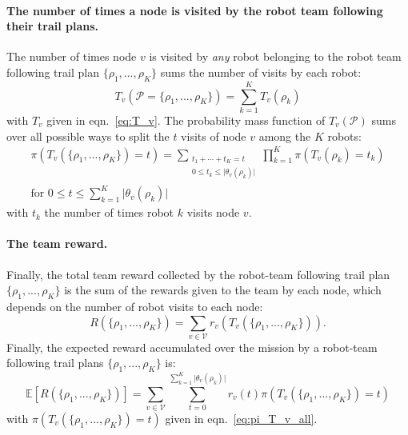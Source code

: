 \documentclass[11pt, oneside]{article}
\begin{document}
\paragraph{The number of times a node is visited by the robot team following their trail plans.} 
The number of times node $v$ is visited by \emph{any} robot belonging to the robot team following trail plan $\{\rho_1, ..., \rho_K\}$ sums the number of visits by each robot:
\begin{equation}
	T_v(\mathcal{P}=\{\rho_1, ..., \rho_K\} ) = \sum_{k=1}^K T_v(\rho_k)
\end{equation} with $T_v$ given in eqn.~\ref{eq:T_v}.
The probability mass function of $T_v(\mathcal{P})$ sums over all possible ways to split the $t$ visits of node $v$ among the $K$ robots:
\begin{multline}
	\pi(T_v(\{\rho_1, ..., \rho_K\} )= t) = 
	\sum_{\substack{t_1 + \cdots + t_K = t \\ 0 \leq t_k \leq  \lvert \theta_v(\rho_k) \rvert}}
	\prod_{k=1}^K \pi(T_v(\rho_k)=t_k) \\
	\text{for } 0 \leq t \leq \sum_{k=1}^K \lvert \theta_v(\rho_k) \rvert \label{eq:pi_T_v_all}
\end{multline} with $t_k $ the number of times robot $k$ visits node $v$.



\paragraph{The team reward.}
Finally, the total team reward collected by the robot-team following trail plan $\{\rho_1, ..., \rho_K\}$ is the sum of the rewards given to the team by each node, which depends on the number of robot visits to each node:
\begin{equation}
R(\{\rho_1,...,\rho_K\}) = \sum_{v\in\mathcal{V}} r_v\left ( T_v(\{\rho_1, ..., \rho_K\}) \right).
\end{equation}
Finally, the expected reward accumulated over the mission by a robot-team following trail plans $\{\rho_1, ..., \rho_K\}$ is:
\begin{equation}
	\mathbb{E}[R(\{\rho_1,...,\rho_K\})]= \sum_{v\in\mathcal{V}} \sum_{t= 0}^{\sum_{k=1}^K \lvert \theta_v(\rho_k) \rvert } r_v(t) \pi(T_v(\{\rho_1, ..., \rho_K\}) = t) \label{eq:formula_obj1}
\end{equation}
with $ \pi(T_v(\{\rho_1, ..., \rho_K\}) = t)$ given in eqn.~\ref{eq:pi_T_v_all}.
\end{document}
